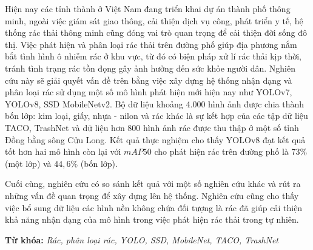 \documentclass[./thesis.tex]{subfiles}
\begin{document}

{\fontsize{13}{12} \selectfont

Hiện nay các tỉnh thành ở Việt Nam đang triển khai dự án thành phố thông minh, ngoài việc giám sát giao thông, cải thiện dịch vụ công, phát triển y tế, hệ thống rác thải thông minh cũng đóng vai trò quan trọng để cải thiện đời sống đô thị.
Việc phát hiện và phân loại rác thải trên đường phố giúp địa phương nắm bắt tình hình ô nhiễm rác ở khu vực, từ đó có biện pháp xử lí rác thải kịp thời, tránh tình trạng rác tồn đọng gây ảnh hưởng đến sức khỏe người dân.
Nghiên cứu này sẽ giải quyết vấn đề trên bằng việc xây dựng hệ thống nhận dạng và phân loại rác sử dụng một số mô hình phát hiện mới hiện nay như YOLOv7, YOLOv8, SSD MobileNetv2.
Bộ dữ liệu khoảng 4.000 hình ảnh được chia thành bốn lớp: kim loại, giấy, nhựa - nilon và rác khác là sự kết hợp của các tập dữ liệu TACO, TrashNet và dữ liệu hơn 800 hình ảnh rác được thu thập ở một số tỉnh Đồng bằng sông Cửu Long.
Kết quả thực nghiệm cho thấy YOLOv8 đạt kết quả tốt hơn hai mô hình còn lại với $mAP50$ cho phát hiện rác trên đường phố là $73\%$ (một lớp) và $44,6\%$ (bốn lớp).

}

{\fontsize{13}{12} \selectfont
Cuối cùng, nghiên cứu có so sánh kết quả với một số nghiên cứu khác và rút ra những vấn đề quan trọng để xây dựng lên hệ thống.
Nghiên cứu cũng cho thấy việc bổ sung dữ liệu các hình nền không chứa đối tượng là rác đã giúp cải thiện khả năng nhận dạng của mô hình trong việc phát hiện rác thải trong tự nhiên.

}
\bigskip



{\bf Từ khóa:} \textit{Rác, phân loại rác, YOLO, SSD, MobileNet, TACO, TrashNet}
\end{document}
